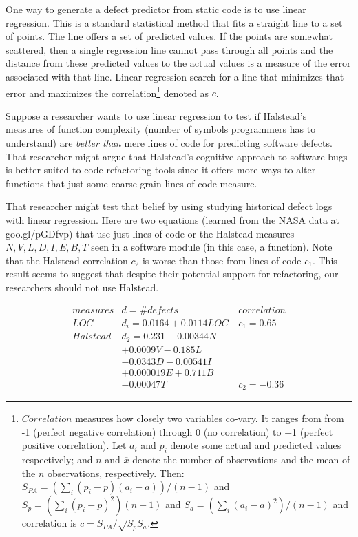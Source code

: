 \documentclass{sig-alternative}
\begin{document}
One way to generate a  defect predictor from
static code is to use 
linear  regression.
This is a standard statistical
method that fits a straight line to a set of points. The line
offers a set of predicted values.
If the points are somewhat
scattered, then a single regression line cannot pass through all points and the distance from these predicted values to the actual
values is a measure of the error associated with that line.
Linear regression search for a line that minimizes that
error and maximizes the correlation\footnote{
$Correlation$
measures how closely two variables co-vary.  It ranges from   from -1
(perfect negative correlation) through 0 (no correlation) to +1
 (perfect positive correlation).
Let  $a_i$ and $p_i$ denote some actual and predicted values respectively; and  $n$ and $\overline{x}$ denote
 the number of observations and the mean of the $n$ observations, 
respectively. Then:
$S_{\mathit{PA}}=(\sum_i (p_i - \overline{p})(a_i -
  \overline{a}))/(n-1)$ and
$S_{p}=(\sum_i (p_i - \overline{p})^2)(n-1)$
and 
$S_{a}=(\sum_i (a_i - \overline{a})^2)/(n-1)$ and
correlation is  $c=S_{\mathit{PA}}/\sqrt{S_pS_a}$.}  denoted as $c$.

Suppose  a researcher wants to use linear regression
to test if Halstead's~\cite{halstead77} measures
of   function complexity
(number of symbols programmers has to understand) are   {\em better than}
mere lines of code for predicting
software defects.  That researcher might argue that Halstead's cognitive approach to
software bugs is better suited to code refactoring tools since it offers 
more ways to alter functions that just some coarse grain lines of code measure.


That researcher might test that belief by using studying historical
defect logs with 
linear regression. Here are two equations (learned from the NASA data at goo.gl/pGDfvp)
that use just lines of code or the Halstead measures $N,V,L,D,I,E,B,T$ seen in a
software module (in this case, a  function).
Note that the Halstead correlation $c_2$
is worse than those from lines of code $c_1$. This result  seems to suggest that
despite their potential support for refactoring, our researchers should not use Halstead.

{\scriptsize \[
\begin{array}{l|l|ll}
\mathit{measures} & d= \mathit{\#defects} & \mathit{correlation}\\\hline
\mathit{LOC}   &d_i= 0.0164 +0.0114\mathit{LOC}\ & c_1 = 0.65\\\hline
\mathit{Halstead} & d_2= 0.231 + 0.00344N     \\    
                 & +  0.0009V   - 0.185L \\
                 & - 0.0343D      - 0.00541I \\
                 & + 0.000019E + 0.711B \\ 
                 &   - 0.00047T  & c_2=-0.36  
\end{array}
\]
}
 
\end{document}

